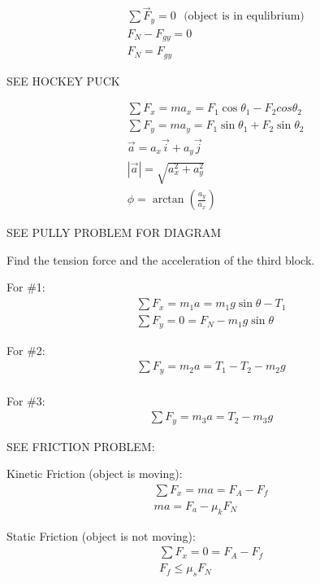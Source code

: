 $$
	\begin{aligned}
		&\sum \vec F_y = 0 \:\:\: \text{(object is in equlibrium)}\\
		&F_{N} - F_{gy} = 0\\
		&F_N = F_{gy}
	\end{aligned}
$$

\begin{problem}
	SEE HOCKEY PUCK

	$$
		\begin{aligned}
			&\sum F_x = ma_x = F_1\cos\theta_1 - F_2cos\theta_2\\
			&\sum F_y = ma_y = F_1\sin\theta_1 + F_2\sin\theta_2\\
			&\vec a = a_x \vec i + a_y \vec j\\
			&|\vec a| = \sqrt{a_x^2 + a_y^2}\\
			&\phi = \arctan\left(\frac{a_y}{a_x}\right)
		\end{aligned}
	$$
\end{problem}

\begin{problem}
	SEE PULLY PROBLEM FOR DIAGRAM

	Find the tension force and the acceleration of the third block.

	For \#1:
	$$
		\begin{aligned}
			\sum F_x = m_1a = m_1g\sin\theta - T_1\\
			\sum F_y = 0 = F_N - m_1g\sin\theta
		\end{aligned}
	$$

	For \#2:
	$$
		\begin{aligned}
			\sum F_y = m_2a = T_1 - T_2 - m_2g\\
		\end{aligned}
	$$


	For \#3:
	$$
		\begin{aligned}
			\sum F_y = m_3a = T_2 - m_3g
		\end{aligned}
	$$
\end{problem}


\begin{problem}
	SEE FRICTION PROBLEM:

	Kinetic Friction (object is moving):
	$$
		\begin{aligned}
			\sum F_x = ma = F_A - F_f\\
			ma = F_a - \mu_kF_N
		\end{aligned}
	$$

	Static Friction (object is not moving):
	$$
		\begin{aligned}
			\sum F_x = 0 = F_A - F_f\\
			F_f \le \mu_s F_N
		\end{aligned}
	$$
\end{problem}

